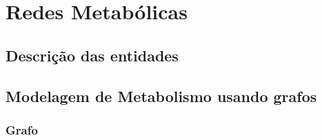 \chapter{Redes Metabólicas}


\section{Descrição das entidades}

\section{Modelagem de Metabolismo usando grafos}

\subsection{Grafo}

\cite{lacroixCTS08}